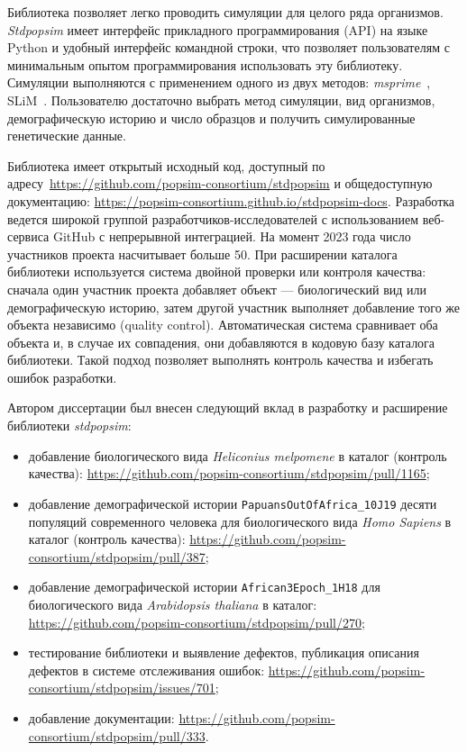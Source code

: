 Библиотека позволяет легко проводить симуляции для целого ряда организмов.
\textit{Stdpopsim} имеет интерфейс прикладного программирования (API) на языке Python и удобный интерфейс командной строки, что позволяет пользователям с минимальным опытом программирования использовать эту библиотеку.
Симуляции выполняются с применением одного из двух методов: \textit{msprime}~\cite{kelleher2016efficient}, SLiM~\cite{haller2019slim}.
Пользователю достаточно выбрать метод симуляции, вид организмов, демографическую историю и число образцов и получить симулированные генетические данные.

Библиотека имеет открытый исходный код, доступный по адресу~\url{https://github.com/popsim-consortium/stdpopsim} и общедоступную документацию: \url{https://popsim-consortium.github.io/stdpopsim-docs}.
Разработка ведется широкой группой разработчиков-исследователей с использованием веб-сервиса GitHub с непрерывной интеграцией.
На момент 2023 года число участников проекта насчитывает больше 50.
При расширении каталога библиотеки используется система двойной проверки или контроля качества: сначала один участник проекта добавляет объект --- биологический вид или демографическую историю, затем другой участник выполняет добавление того же объекта независимо (quality control).
Автоматическая система сравнивает оба объекта и, в случае их совпадения, они добавляются в кодовую базу каталога библиотеки.
Такой подход позволяет выполнять контроль качества и избегать ошибок разработки.

Автором диссертации был внесен следующий вклад в разработку и расширение библиотеки \textit{stdpopsim}:
\begin{itemize}
    \item добавление биологического вида \textit{Heliconius melpomene} в каталог (контроль качества): \url{https://github.com/popsim-consortium/stdpopsim/pull/1165};
    \item добавление демографической истории \texttt{PapuansOutOfAfrica\_10J19} десяти популяций современного человека для биологического вида \textit{Homo Sapiens} в каталог (контроль качества): \url{https://github.com/popsim-consortium/stdpopsim/pull/387};
    \item добавление демографической истории \texttt{African3Epoch\_1H18} для биологического вида \textit{Arabidopsis thaliana} в каталог: \url{https://github.com/popsim-consortium/stdpopsim/pull/270};
    \item тестирование библиотеки и выявление дефектов, публикация описания дефектов в системе отслеживания ошибок: \url{https://github.com/popsim-consortium/stdpopsim/issues/701};
    \item добавление документации: \url{https://github.com/popsim-consortium/stdpopsim/pull/333}.
\end{itemize}

